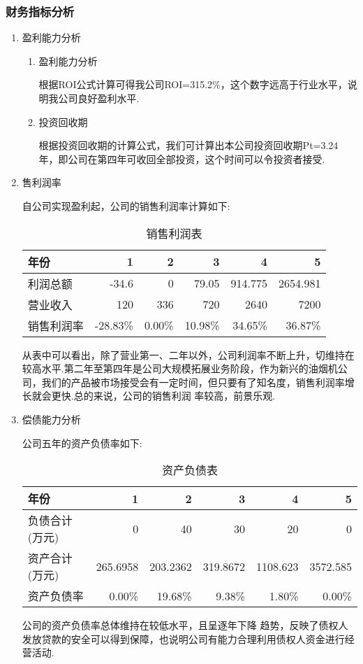 \subsubsection{财务指标分析}
\begin{enumerate}
\item 盈利能力分析

      \begin{enumerate}[(1)]
      \item 盈利能力分析

            根据ROI公式计算可得我公司ROI=315.2\%，这个数字远高于行业水平，说明我公司良好盈利水平.

      \item 投资回收期

            根据投资回收期的计算公式，我们可计算出本公司投资回收期Pt=3.24年，即公司在第四年可收回全部投资，这个时间可以令投资者接受.
      \end{enumerate}

\item 售利润率

      自公司实现盈利起，公司的销售利润率计算如下:

      \begin{table}[H]
      \centering
      \caption{销售利润表}
      \begin{tabular}{|lrrrrr|}
      \toprule
      年份    & 1     & 2     & 3     & 4     & 5 \\
      \hline
      利润总额  & -34.6 & 0     & 79.05 & 914.775 & 2654.981 \\
      营业收入  & 120   & 336   & 720   & 2640  & 7200 \\
      销售利润率 & -28.83\% & 0.00\% & 10.98\% & 34.65\% & 36.87\% \\
      \bottomrule
      \end{tabular}%
      \label{tab:addlabel}%
      \end{table}%

      从表中可以看出，除了营业第一、二年以外，公司利润率不断上升，切维持在较高水平.第二年至第四年是公司大规模拓展业务阶段，作为新兴的油烟机公司，我们的产品被市场接受会有一定时间，但只要有了知名度，销售利润率增长就会更快.总的来说，公司的销售利润 率较高，前景乐观.

\item 偿债能力分析

      公司五年的资产负债率如下:

      \begin{table}[H]
      \centering
      \caption{资产负债表}
      \begin{tabular}{|lrrrrr|}
      \toprule
      年份    & 1     & 2     & 3     & 4     & 5 \\
      \hline
      负债合计(万元) & 0     & 40    & 30    & 20    & 0 \\
      资产合计(万元) & 265.6958 & 203.2362 & 319.8672 & 1108.623 & 3572.585 \\
      资产负债率 & 0.00\% & 19.68\% & 9.38\% & 1.80\% & 0.00\% \\
      \bottomrule
      \end{tabular}%
      \label{tab:addlabel}%
      \end{table}%

      公司的资产负债率总体维持在较低水平，且呈逐年下降 趋势，反映了债权人发放贷款的安全可以得到保障，也说明公司有能力合理利用债权人资金进行经营活动.
\end{enumerate}